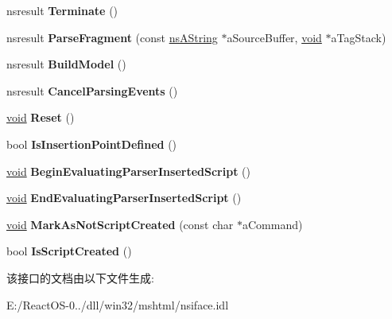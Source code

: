 \begin{DoxyCompactItemize}
\item 
\mbox{\label{interfacens_i_parser_a755fdda3d4283df5b0ee83df9a9b288c}} 
nsresult {\bfseries Terminate} ()
\item 
\mbox{\label{interfacens_i_parser_ac5e64b82763e2748a748131c40e68209}} 
nsresult {\bfseries Parse\+Fragment} (const \hyperlink{structns_string_container}{ns\+A\+String} $\ast$a\+Source\+Buffer, \hyperlink{interfacevoid}{void} $\ast$a\+Tag\+Stack)
\item 
\mbox{\label{interfacens_i_parser_a5748d81135ba606b169d944d53c010e0}} 
nsresult {\bfseries Build\+Model} ()
\item 
\mbox{\label{interfacens_i_parser_ae2f34795b025df2b26c6deb87fda51eb}} 
nsresult {\bfseries Cancel\+Parsing\+Events} ()
\item 
\mbox{\label{interfacens_i_parser_ab8f8fab16fb8399204410b11c49fd691}} 
\hyperlink{interfacevoid}{void} {\bfseries Reset} ()
\item 
\mbox{\label{interfacens_i_parser_a090c16d994a5e4805db75a490d555e6d}} 
bool {\bfseries Is\+Insertion\+Point\+Defined} ()
\item 
\mbox{\label{interfacens_i_parser_a92066b0ef1276f8febfeef6f9ed9ca94}} 
\hyperlink{interfacevoid}{void} {\bfseries Begin\+Evaluating\+Parser\+Inserted\+Script} ()
\item 
\mbox{\label{interfacens_i_parser_aaa364aad0a827d4f90c0598fae46e037}} 
\hyperlink{interfacevoid}{void} {\bfseries End\+Evaluating\+Parser\+Inserted\+Script} ()
\item 
\mbox{\label{interfacens_i_parser_ab69fe0076e5d7e8066290856e0c6c3b9}} 
\hyperlink{interfacevoid}{void} {\bfseries Mark\+As\+Not\+Script\+Created} (const char $\ast$a\+Command)
\item 
\mbox{\label{interfacens_i_parser_ac20d4d9db10ac7764791b034a82928af}} 
bool {\bfseries Is\+Script\+Created} ()
\end{DoxyCompactItemize}


该接口的文档由以下文件生成\+:\begin{DoxyCompactItemize}
\item 
E\+:/\+React\+O\+S-\/0../dll/win32/mshtml/nsiface.\+idl\end{DoxyCompactItemize}
